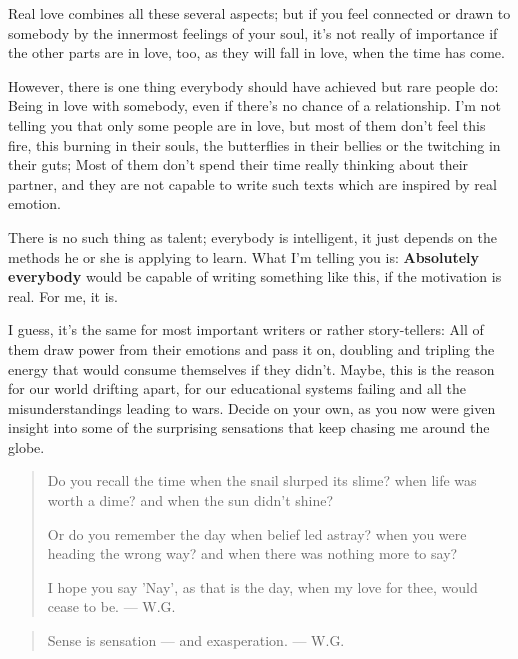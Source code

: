Real love combines all these several aspects; but if you feel connected or drawn to somebody by the innermost feelings of your soul, it's not really of importance if the other parts are in love, too, as they will fall in love, when the time has come.

However, there is one thing everybody should have achieved but rare people do: Being in love with somebody, even if there's no chance of a relationship. 
I'm not telling you that only some people are in love, but most of them don't feel this fire, this burning in their souls, the butterflies in their bellies or the twitching in their guts; Most of them don't spend their time really thinking about their partner, and they are not capable to write such texts which are inspired by real emotion.

There is no such thing as talent; everybody is intelligent, it just depends on the methods he or she is applying to learn. 
What I'm telling you is: \textbf{Absolutely everybody} would be capable of writing something like this, if the motivation is real. 
For me, it is.

I guess, it's the same for most important writers or rather story-tellers: All of them draw power from their emotions and pass it on, doubling and tripling the energy that would consume themselves if they didn't. 
Maybe, this is the reason for our world drifting apart, for our educational systems failing and all the misunderstandings leading to wars. 
Decide on your own, as you now were given insight into some of the surprising sensations that keep chasing me around the globe. 

\begin{verse}
Do you recall the time
when the snail slurped its slime?
when life was worth a dime?
and when the sun didn't shine?

Or do you remember the day
when belief led astray?
when you were heading the wrong way?
and when there was nothing more to say?

I hope you say 'Nay',
as that is the day,
when my love for thee,
would cease to be. 
--- W.G.
\end{verse}

\begin{verse}
Sense is sensation --- and exasperation. 
--- W.G.
\end{verse}

